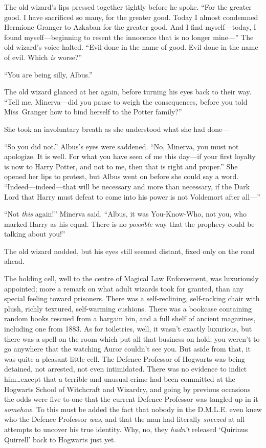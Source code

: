 The old wizard’s lips pressed together tightly before he spoke. “For the greater good. I have sacrificed so many, for the greater good. Today I almost condemned Hermione Granger to Azkaban for the greater good. And I find myself—today, I found myself—beginning to resent the innocence that is no longer mine—” The old wizard’s voice halted. “Evil done in the name of good. Evil done in the name of evil. Which \emph{is} worse?”

“You are being silly, Albus.”

The old wizard glanced at her again, before turning his eyes back to their way. “Tell me, Minerva—did you pause to weigh the consequences, before you told Miss~Granger how to bind herself to the Potter family?”

She took an involuntary breath as she understood what she had done—

“So you did not.” Albus’s eyes were saddened. “No, Minerva, you must not apologize. It is well. For what you have seen of me this day—if your first loyalty is now to Harry Potter, and not to me, then that is right and proper.” She opened her lips to protest, but Albus went on before she could say a word. “Indeed—indeed—that will be necessary and more than necessary, if the Dark Lord that Harry must defeat to come into his power is not Voldemort after all—”

“Not \emph{this} again!” Minerva said. “Albus, it was You-Know-Who, not you, who marked Harry as his equal. There is no \emph{possible} way that the prophecy could be talking about you!”

The old wizard nodded, but his eyes still seemed distant, fixed only on the road ahead.

\later

The holding cell, well to the centre of Magical Law Enforcement, was luxuriously appointed; more a remark on what adult wizards took for granted, than any special feeling toward prisoners. There was a self-reclining, self-rocking chair with plush, richly textured, self-warming cushions. There was a bookcase containing random books rescued from a bargain bin, and a full shelf of ancient magazines, including one from 1883. As for toiletries, well, it wasn’t exactly luxurious, but there was a spell on the room which put all that business on hold; you weren’t to go anywhere that the watching Auror couldn’t see you. But aside from that, it was quite a pleasant little cell. The Defence Professor of Hogwarts was being detained, not arrested, not even intimidated. There was no evidence to indict him…except that a terrible and unusual crime had been committed at the Hogwarts School of Witchcraft and Wizardry, and going by previous occasions the odds were five to one that the current Defence Professor was tangled up in it \emph{somehow}. To this must be added the fact that nobody in the D.M.L.E. even knew who the Defence Professor \emph{was}, and that the man had literally \emph{sneezed} at all attempts to uncover his true identity. Why, no, they \emph{hadn’t} released ‘Quirinus Quirrell’ back to Hogwarts just yet.


